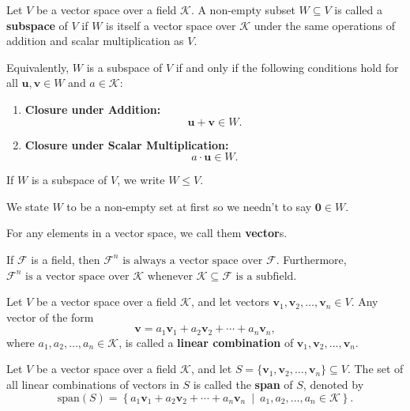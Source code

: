 \documentclass{ctexart}
\begin{document}
	\begin{mydef}
		Let $V$ be a vector space over a field $\mathcal{K}$.  
		A non-empty subset $W \subseteq V$ is called a \textbf{subspace} of $V$ if $W$ is itself a vector space over $\mathcal{K}$ under the same operations of addition and scalar multiplication as $V$.
		
		Equivalently, $W$ is a subspace of $V$ if and only if the following conditions hold for all $\mathbf{u}, \mathbf{v} \in W$ and $a \in \mathcal{K}$:
		\begin{enumerate}
			\item \textbf{Closure under Addition:} 
			\[
			\mathbf{u} + \mathbf{v} \in W.
			\]
			\item \textbf{Closure under Scalar Multiplication:} 
			\[
			a \cdot \mathbf{u} \in W.
			\]
		\end{enumerate}
		
	\end{mydef}
	\begin{mynot}
		If $W$ is a subspace of $V$, we write $W \leq V$.
	\end{mynot}
	\begin{myrmk}
		We state $W$ to be a non-empty set at first so we needn't to say $\mathbf{0}\in W$.
	\end{myrmk}
	\begin{myrmk}
		For any elements in a vector space, we call them \textbf{vector}s.
	\end{myrmk}
	\begin{myex}
		If $\mathcal{F}$ is a field, then $\mathcal{F}^n \text{ is always a vector space over } \mathcal{F}.$ Furthermore, $\mathcal{F}^n \text{ is a vector space over } \mathcal{K} \text{ whenever } \mathcal{K} \subseteq \mathcal{F} \text{ is a subfield.}$
	\end{myex}
	\begin{mydef}
		Let $V$ be a vector space over a field $\mathcal{K}$, and let vectors
		$\mathbf{v}_1, \mathbf{v}_2, \dots, \mathbf{v}_n \in V$.  
		Any vector of the form
		\[
		\mathbf{v} = a_1 \mathbf{v}_1 + a_2 \mathbf{v}_2 + \cdots + a_n \mathbf{v}_n,
		\]
		where $a_1, a_2, \dots, a_n \in \mathcal{K}$, is called a \textbf{linear combination} of 
		$\mathbf{v}_1, \mathbf{v}_2, \dots, \mathbf{v}_n$.
	\end{mydef}
	\begin{mydef}
		Let $V$ be a vector space over a field $\mathcal{K}$, and let 
		$S = \{\mathbf{v}_1, \mathbf{v}_2, \dots, \mathbf{v}_n\} \subseteq V$.  
		The set of all linear combinations of vectors in $S$ is called the 
		\textbf{span} of $S$, denoted by
		\[
		\mathrm{span}(S) = 
		\left\{
		a_1 \mathbf{v}_1 + a_2 \mathbf{v}_2 + \cdots + a_n \mathbf{v}_n 
		\ \middle| \ a_1, a_2, \dots, a_n \in \mathcal{K}
		\right\}.
		\]
	\end{mydef}
\end{document}
